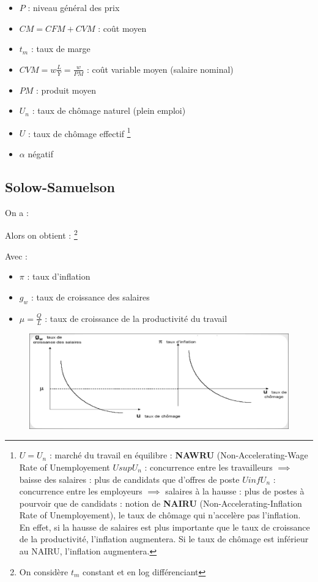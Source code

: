 \begin{itemize}
    \item $P$ : niveau général des prix
    \item $CM = CFM + CVM$ : coût moyen
    \item $t_{m}$ : taux de marge 
    \item $CVM = w\frac{L}{Y} = \frac{w}{PM}$ : coût variable moyen (salaire nominal) 
    \item $PM$ : produit moyen
    \item $U_{n}$ : taux de chômage naturel (plein emploi)
    \item $U$ : taux de chômage effectif \footnote{$
    U = U_{n}$ : marché du travail en équilibre : \textbf{NAWRU} (Non-Accelerating-Wage Rate of Unemployement
    $U sup U_{n}$ : concurrence entre les travailleurs $\implies$ baisse des salaires : plus de candidats que d'offres de poste
    \newline
    $U inf U_{n}$ : concurrence entre les employeurs $\implies$ salaires à la hausse : plus de postes à pourvoir que de candidats : notion de \textbf{NAIRU} (Non-Accelerating-Inflation Rate of Unemployement), le taux de chômage qui n'accelère pas l'inflation.
    En effet, si la hausse de salaires est plus importante que le taux de croissance de la productivité, l'inflation augmentera. Si le taux de chômage est inférieur au NAIRU, l'inflation augmentera.
     }
    \item $\alpha$ négatif
\end{itemize}
\newpage
\subsection{Solow-Samuelson}
On a : 
\begin{center}
    \Large{}
\end{center}
Alors on obtient : \footnote{On considère $t_{m}$ constant et en log différenciant}
\begin{center}
    \Large{}
\end{center}
Avec : 
\begin{itemize}
    \item $\pi$ : taux d'inflation
    \item $g_{w}$ : taux de croissance des salaires
    \item $\mu = \frac{Q}{L}$ : taux de croissance de la productivité du travail
\end{itemize}
\begin{figure}[hbt!]
    \includegraphics[scale = 0.4]{Pics/Solow_Samuelson.png}
\end{figure}
\newpage
